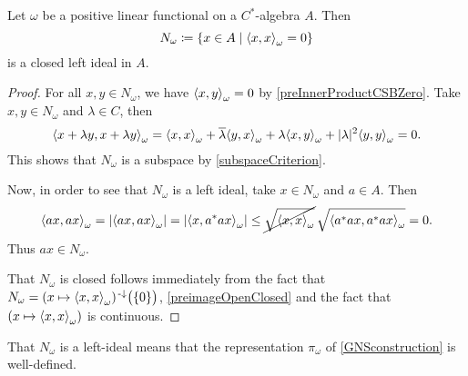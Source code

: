 \begin{lemma} \label{GNSLeftIdeal}
Let $\omega$ be a positive linear functional on a $C^*$-algebra $A$. Then
\[ N_\omega \defeq \setbuilder{x\in A}{\inner{x,x}_\omega = 0} \]
is a closed left ideal in $A$.
\end{lemma}
\begin{proof}
For all $x,y\in N_\omega$, we have $\inner{x,y}_\omega = 0$ by \ref{preInnerProductCSBZero}.
Take $x,y\in N_\omega$ and $\lambda \in C$, then
\[ \inner{x+\lambda y,x+\lambda y}_\omega = \inner{x,x}_\omega + \overline{\lambda}\inner{y,x}_\omega + \lambda\inner{x,y}_\omega + |\lambda|^2\inner{y,y}_\omega = 0. \]
This shows that $N_\omega$ is a subspace by \ref{subspaceCriterion}.

Now, in order to see that $N_\omega$ is a left ideal, take $x\in N_\omega$ and $a\in A$. Then
\[ \inner{ax,ax}_{\omega} = |\inner{ax,ax}_{\omega}| = |\inner{x,a^*ax}_{\omega}| \leq \cancel{\sqrt{\inner{x,x}_\omega}}\, \sqrt{\inner{a^*ax,a^*ax}_\omega} = 0. \]
Thus $ax\in N_\omega$.

That $N_\omega$ is closed follows immediately from the fact that $N_\omega = (x\mapsto \inner{x,x}_\omega)^{\preimf}\big(\{0\}\big)$, \ref{preimageOpenClosed} and the fact that $(x\mapsto \inner{x,x}_\omega)$ is continuous.
\end{proof}
That $N_\omega$ is a left-ideal means that the representation $\pi_\omega$ of \ref{GNSconstruction} is well-defined.


